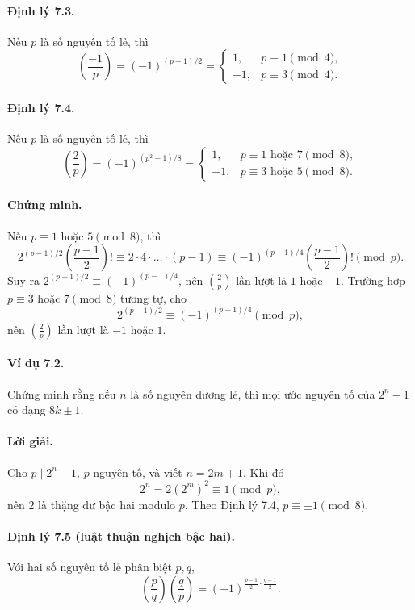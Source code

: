 \documentclass[11pt]{article}
\newcommand{\leg}[2]{\left(\frac{#1}{#2}\right)}
\begin{document}
\paragraph{Định lý 7.3.}
Nếu \(p\) là số nguyên tố lẻ, thì
\[
 \leg{-1}p=(-1)^{(p-1)/2}
 =
\begin{cases}
1,&p\equiv1\pmod4,\\
-1,&p\equiv3\pmod4.
\end{cases}
\]

\paragraph{Định lý 7.4.}
Nếu \(p\) là số nguyên tố lẻ, thì
\[
 \leg2p=(-1)^{(p^2-1)/8}
 =
\begin{cases}
1,&p\equiv1\text{ hoặc }7\pmod8,\\
-1,&p\equiv3\text{ hoặc }5\pmod8.
\end{cases}
\]

\paragraph{Chứng minh.}
Nếu \(p\equiv1\) hoặc \(5\pmod8\), thì
\[
 2^{(p-1)/2}\left(\frac{p-1}{2}\right)!
 \equiv2\cdot4\cdot\ldots\cdot(p-1)
 \equiv(-1)^{(p-1)/4}\left(\frac{p-1}{2}\right)!\pmod p.
\]
Suy ra \(2^{(p-1)/2}\equiv(-1)^{(p-1)/4}\), nên \(\leg2p\) lần lượt là \(1\)
hoặc \(-1\). Trường hợp \(p\equiv3\) hoặc \(7\pmod8\) tương tự, cho
\[
 2^{(p-1)/2}\equiv(-1)^{(p+1)/4}\pmod p,
\]
nên \(\leg2p\) lần lượt là \(-1\) hoặc \(1\).

\paragraph{Ví dụ 7.2.}
Chứng minh rằng nếu \(n\) là số nguyên dương lẻ, thì mọi ước nguyên tố của
\(2^n-1\) có dạng \(8k\pm1\).

\paragraph{Lời giải.}
Cho \(p\mid2^n-1\), \(p\) nguyên tố, và viết \(n=2m+1\). Khi đó
\[
 2^n=2(2^m)^2\equiv1\pmod p,
\]
nên \(2\) là thặng dư bậc hai modulo \(p\). Theo Định lý 7.4, \(p\equiv\pm1
\pmod8\).

\paragraph{Định lý 7.5 (luật thuận nghịch bậc hai).}
Với hai số nguyên tố lẻ phân biệt \(p,q\),
\[
 \leg pq\leg qp=(-1)^{\frac{p-1}{2}\cdot\frac{q-1}{2}}.
\]
\end{document}
